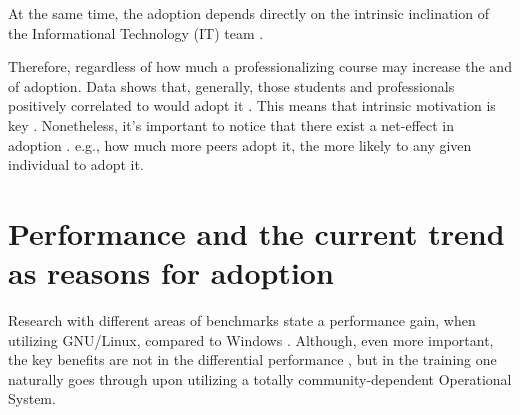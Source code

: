 \documentclass[
12pt,				%
openright,			%
oneside,			%
a4paper,			%
brazil,				%
english,			%
]{abntex2}
\begin{document}
At the same time, the adoption depends directly on the intrinsic inclination of the Informational Technology (IT) team \cite{racero2021can}. 

Therefore, regardless of how much a professionalizing course may increase the  and  of adoption. Data shows that, generally, those students and professionals positively correlated to  would adopt it \cite{racero2020predicting}. This means that intrinsic motivation is key \cite{gallego2015open}. Nonetheless, it's important to notice that there exist a net-effect in adoption \cite{spinellis2012organizational}. e.g., how much more peers adopt it, the more likely to any given individual to adopt it.      

\section{Performance and the current trend as reasons for adoption}

Research with different areas of benchmarks state a performance gain, when utilizing GNU/Linux, compared to Windows \cite{sulaiman2021comparison}. Although, even more important, the key benefits are not in the differential performance , but in the training one naturally goes through upon utilizing a totally community-dependent Operational System. 
\end{document}
